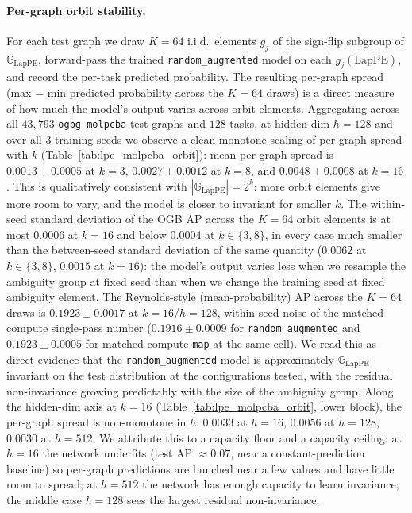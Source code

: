 \documentclass{article}
\theoremstyle{definition}
\theoremstyle{plain}
\newcommand{\G}{\mathbb{G}}
\begin{document}
\paragraph{Per-graph orbit stability.}
For each test graph we draw $K\!=\!64$ i.i.d.\ elements $g_j$ of the
sign-flip subgroup of $\G_{\mathrm{LapPE}}$, forward-pass the trained
\texttt{random\_augmented} model on each $g_j(\mathrm{LapPE})$, and
record the per-task predicted probability. The resulting per-graph
spread (max $-$ min predicted probability across the $K\!=\!64$ draws)
is a direct measure of how much the model's output varies across
orbit elements. Aggregating across all $43{,}793$ \texttt{ogbg-molpcba}
test graphs and $128$ tasks, at hidden dim $h\!=\!128$ and over all
$3$ training seeds we observe a clean monotone scaling of per-graph
spread with $k$ (Table~\ref{tab:lpe_molpcba_orbit}): mean per-graph
spread is $0.0013\!\pm\!0.0005$ at $k\!=\!3$, $0.0027\!\pm\!0.0012$
at $k\!=\!8$, and $0.0048\!\pm\!0.0008$ at $k\!=\!16$. This is
qualitatively consistent with $|\G_{\mathrm{LapPE}}|\!=\!2^{k}$:
more orbit elements give more room to vary, and the model is closer
to invariant for smaller $k$. The within-seed standard deviation of
the OGB AP across the $K\!=\!64$ orbit elements is at most $0.0006$
at $k\!=\!16$ and below $0.0004$ at $k\!\in\!\{3,8\}$, in every case
much smaller than the between-seed standard deviation of the same
quantity ($0.0062$ at $k\!\in\!\{3,8\}$, $0.0015$ at $k\!=\!16$):
the model's output varies less when we resample the ambiguity group
at fixed seed than when we change the training seed at fixed
ambiguity element. The Reynolds-style (mean-probability) AP across
the $K\!=\!64$ draws is $0.1923\!\pm\!0.0017$ at
$k\!=\!16$/$h\!=\!128$, within seed noise of the matched-compute
single-pass number ($0.1916\!\pm\!0.0009$ for
\texttt{random\_augmented} and $0.1923\!\pm\!0.0005$ for
matched-compute \texttt{map} at the same cell). We read this as
direct evidence that the \texttt{random\_augmented} model is
approximately $\G_{\mathrm{LapPE}}$-invariant on the test
distribution at the configurations tested, with the residual
non-invariance growing predictably with the size of the ambiguity
group. Along the hidden-dim axis at $k\!=\!16$
(Table~\ref{tab:lpe_molpcba_orbit}, lower block), the per-graph
spread is non-monotone in $h$: $0.0033$ at $h\!=\!16$,
$0.0056$ at $h\!=\!128$, $0.0030$ at $h\!=\!512$. We attribute
this to a capacity floor and a capacity ceiling: at $h\!=\!16$ the
network underfits (test AP $\approx\!0.07$, near a constant-prediction
baseline) so per-graph predictions are bunched near a few values
and have little room to spread; at $h\!=\!512$ the network has
enough capacity to learn invariance; the middle case $h\!=\!128$
sees the largest residual non-invariance.
\end{document}
